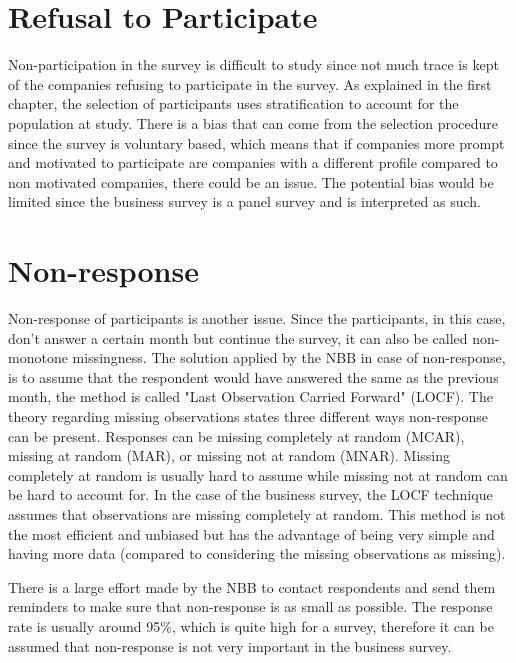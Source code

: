 \documentclass[12pt,a4paper,oneside]{book}
\begin{document}


\section{Refusal to Participate}

Non-participation in the survey is difficult to study since not much trace is kept of the companies refusing to participate in the survey. As explained in the first chapter, the selection of participants uses stratification to account for the population at study.
There is a bias that can come from the selection procedure since the survey is voluntary based, which means that if companies more prompt and motivated to participate are companies with a different profile compared to non motivated companies, there could be an issue.
The potential bias would be limited since the business survey is a panel survey and is interpreted as such.

\section{Non-response}

Non-response of participants is another issue. 
Since the participants, in this case, don't answer a certain month but continue the survey, it can also be called non-monotone missingness.
The solution applied by the NBB in case of non-response, is to assume that the respondent would have answered the same as the previous month, the method is called "Last Observation Carried Forward" (LOCF). 
The theory regarding missing observations states three different ways non-response can be present. Responses can be missing completely at random (MCAR), missing at random (MAR), or missing not at random (MNAR). Missing completely at random is usually hard to assume while missing not at random can be hard to account for.
In the case of the business survey, the LOCF technique assumes that observations are missing completely at random. This method is not the most efficient and unbiased but has the advantage of being very simple and having more data (compared to considering the missing observations as missing). 

There is a large effort made by the NBB to contact respondents and send them reminders to make sure that non-response is as small as possible.
The response rate is usually around 95\%, which is quite high for a survey, therefore it can be assumed that non-response is not very important in the business survey.
\end{document}
